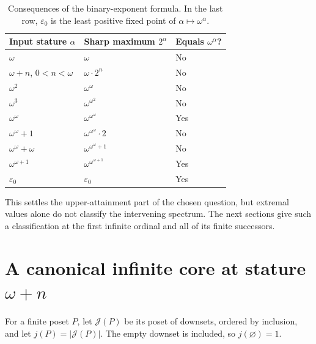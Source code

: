 \documentclass[11pt,a4paper]{article}
\theoremstyle{definition}
\newcommand{\JJ}{\mathcal J}
\numberwithin{equation}{section}
\begin{document}
\begin{table}[htbp]
\centering
\begin{tabular}{@{}lll@{}}
\toprule
Input stature $\alpha$ & Sharp maximum $2^\alpha$ & Equals $\omega^\alpha$?\\
\midrule
$\omega$ & $\omega$ & No\\
$\omega+n$, $0<n<\omega$ & $\omega\cdot2^n$ & No\\
$\omega^2$ & $\omega^\omega$ & No\\
$\omega^3$ & $\omega^{\omega^2}$ & No\\
$\omega^\omega$ & $\omega^{\omega^\omega}$ & Yes\\
$\omega^\omega+1$ & $\omega^{\omega^\omega}\cdot2$ & No\\
$\omega^\omega+\omega$ & $\omega^{\omega^\omega+1}$ & No\\
$\omega^{\omega+1}$ & $\omega^{\omega^{\omega+1}}$ & Yes\\
$\varepsilon_0$ & $\varepsilon_0$ & Yes\\
\bottomrule
\end{tabular}
\caption{Consequences of the binary-exponent formula.  In the last row,
$\varepsilon_0$ is the least positive fixed point of $\alpha\mapsto\omega^\alpha$.}
\label{tab:ordinals}
\end{table}

This settles the upper-attainment part of the chosen question, but
extremal values alone do not classify the intervening spectrum.  The
next sections give such a classification at the first infinite ordinal
and all of its finite successors.

\section{A canonical infinite core at stature \texorpdfstring{$\omega+n$}{omega+n}}
\label{sec:core}

For a finite poset $P$, let $\JJ(P)$ be its poset of downsets, ordered
by inclusion, and let $j(P)=|\JJ(P)|$.  The empty downset is included,
so $j(\varnothing)=1$.
\end{document}
